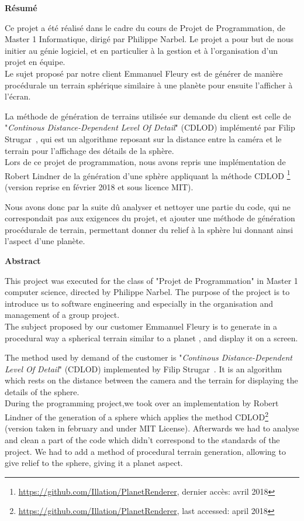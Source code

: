 {\Large
\begin{center}
    \textbf{Résumé}
\end{center}
}

Ce projet a été réalisé dans le cadre du cours de Projet de Programmation, de Master 1 Informatique, dirigé par Philippe Narbel. Le projet a pour but de nous initier au génie logiciel, et en particulier à la gestion et à l'organisation d'un projet en équipe.\\

Le sujet proposé par notre client Emmanuel Fleury est de générer de manière procédurale un terrain sphérique similaire à une planète pour ensuite l’afficher à l’écran.

La méthode de génération de terrains utilisée sur demande du client est celle de "\emph{Continous Distance-Dependent Level Of Detail}" (CDLOD) implémenté par Filip Strugar~\cite{CDLOD}, qui est un algorithme reposant sur la distance entre la caméra et le terrain pour l'affichage des détails de la sphère.\\

Lors de ce projet de programmation, nous avons repris une implémentation de Robert Lindner de la génération d'une sphère appliquant la méthode CDLOD \footnote{\url{https://github.com/Illation/PlanetRenderer}, dernier accès: avril 2018} (version reprise en février 2018 et sous licence MIT).

Nous avons donc par la suite dû analyser et nettoyer une partie du code, qui ne correspondait pas aux exigences du projet, et ajouter une méthode de génération procédurale de terrain, permettant donner du relief à la sphère lui donnant ainsi l'aspect d'une planète. 

{\Large
\begin{center}
    \textbf{Abstract}
\end{center}
}

This project was executed for the class of "Projet de Programmation" in Master 1 computer science, directed by Philippe Narbel. The purpose of the project is to introduce us to software engineering and especially in the organisation and management of a group project.\\

The subject proposed by our customer Emmanuel Fleury is to generate in a procedural way a spherical terrain similar to a planet , and display it on a screen.

The method used by demand of the customer is "\emph{Continous Distance-Dependent Level Of Detail}" (CDLOD) implemented by Filip Strugar~\cite{CDLOD}. It is an algorithm which rests on the distance between the camera and the terrain for displaying the details of the sphere.\\

During the programming project,we took over an implementation by Robert Lindner of the generation of a sphere which applies the method CDLOD\footnote{\url{https://github.com/Illation/PlanetRenderer}, last accessed: april 2018} (version taken in february and under MIT License).
Afterwards we had to analyse and clean a part of the code which didn't correspond to the standards of the project. We had to add a method of procedural terrain generation, allowing to give relief to the sphere, giving it a planet aspect.